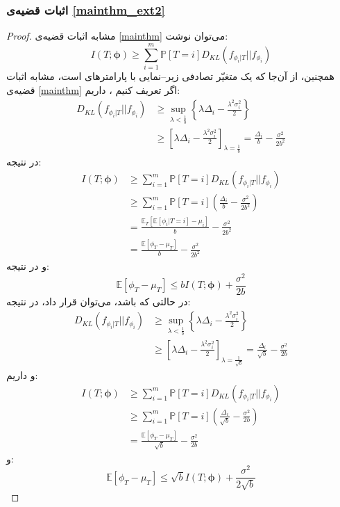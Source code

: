\documentclass[a4paper,12pt]{article}
\newcommand{\E}{\mathbb{E}}
\newcommand{\Prob}{\mathbb{P}}
\newcommand{\bfphi}{\bm {\phi}}
\begin{document}
	\subsubsection{اثبات قضیه‌ی
		\eqref{mainthm_ext2}}
	\begin{proof}
		مشابه اثبات قضیه‌ی
		\eqref{mainthm}
		می‌توان نوشت:
		\begin{equation}
		I(T;\bfphi)\geq \sum_{i = 1}^{m} \Prob[T=i] D_{KL}(f_{\phi_i|T}||f_{\phi_i})
		\end{equation}
		همچنین، از آن‌جا که 
		یک متغیّر تصادفی زیر--نمایی با پارامترهای
		است، مشابه اثبات قضیه‌ی
		\eqref{mainthm}
		اگر تعریف کنیم
		\lr{$\Delta_i = \E[\phi_i|T=i]-\mu_i$}،
		داریم:
		\begin{align}
		D_{KL}(f_{\phi_i|T}||f_{\phi_i})&\geq \sup_{\lambda<\frac{1}{b}}\left\{\lambda\Delta_i-\frac{\lambda^2\sigma_i^2}{2}\right\}\\
		&\geq \left[\lambda\Delta_i-\frac{\lambda^2\sigma_i^2}{2}\right]_{\lambda=\frac{1}{b}} = \frac{\Delta_i}{b} - \frac{\sigma^2}{2b^2}
		\end{align}
		در نتیجه:
		\begin{align}
		I(T;\bfphi)&\geq \sum_{i = 1}^{m} \Prob[T=i] D_{KL}(f_{\phi_i|T}||f_{\phi_i})\\
		&\geq \sum_{i = 1}^{m} \Prob[T=i] \left(\frac{\Delta_i}{b} - \frac{\sigma^2}{2b^2}\right)\\
		&= \frac{\E_T[\E[\phi_i|T=i]-\mu_i]}{b}- \frac{\sigma^2}{2b^2}\\
		&= \frac{\E[\phi_T-\mu_T]}{b} - \frac{\sigma^2}{2b^2}
		\end{align}
		و در نتیجه:
		\begin{equation}
		\E[\phi_T-\mu_T]\leq bI(T;\bm{\phi}) + \frac{\sigma^2}{2b}
		\end{equation}
		در حالتی که
		باشد، می‌توان
		قرار داد، در نتیجه:
		\begin{align}
		D_{KL}(f_{\phi_i|T}||f_{\phi_i})&\geq \sup_{\lambda<\frac{1}{b}}\left\{\lambda\Delta_i-\frac{\lambda^2\sigma_i^2}{2}\right\}\\
		&\geq \left[\lambda\Delta_i-\frac{\lambda^2\sigma_i^2}{2}\right]_{\lambda=\frac{1}{\sqrt{b}}} = \frac{\Delta_i}{\sqrt{b}} - \frac{\sigma^2}{2b}
		\end{align}
		و داریم:
		\begin{align}
		I(T;\bfphi)&\geq \sum_{i = 1}^{m} \Prob[T=i] D_{KL}(f_{\phi_i|T}||f_{\phi_i})\\
		&\geq \sum_{i = 1}^{m} \Prob[T=i] \left(\frac{\Delta_i}{\sqrt{b}} - \frac{\sigma^2}{2b}\right)\\
		&= \frac{\E[\phi_T-\mu_T]}{\sqrt{b}} - \frac{\sigma^2}{2b}
		\end{align}
		و:
		\begin{equation}
		\E[\phi_T-\mu_T]\leq \sqrt{b}I(T;\bm{\phi}) + \frac{\sigma^2}{2\sqrt{b}}
		\end{equation}
	\end{proof}
\end{document}
